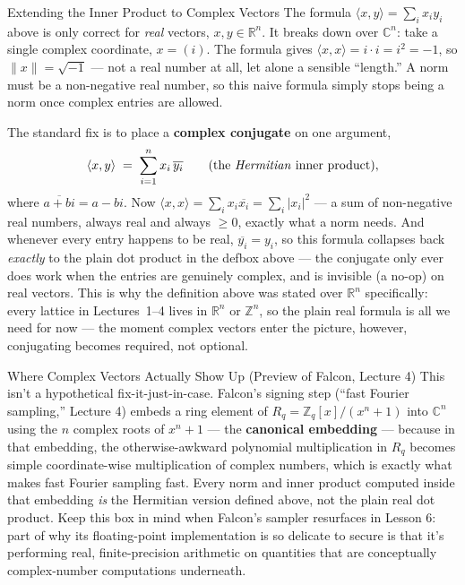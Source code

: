 \begin{rmkbox}{Extending the Inner Product to Complex Vectors}
The formula $\langle x,y\rangle=\sum_i x_iy_i$ above is only correct for \emph{real} vectors, $x,y\in\mathbb{R}^n$. It breaks down over $\mathbb{C}^n$: take a single complex coordinate, $x=(i)$. The formula gives $\langle x,x\rangle = i\cdot i = i^2 = -1$, so $\|x\| = \sqrt{-1}$ --- not a real number at all, let alone a sensible ``length.'' A norm must be a non-negative real number, so this naive formula simply stops being a norm once complex entries are allowed.

The standard fix is to place a \textbf{complex conjugate} on one argument,
$$
\langle x,y\rangle \;=\; \sum_{i=1}^n x_i\,\overline{y_i} \qquad \text{(the \emph{Hermitian} inner product)},
$$
where $\overline{a+bi} = a-bi$. Now $\langle x,x\rangle = \sum_i x_i\overline{x_i} = \sum_i |x_i|^2$ --- a sum of non-negative real numbers, always real and always $\ge 0$, exactly what a norm needs. And whenever every entry happens to be real, $\overline{y_i}=y_i$, so this formula collapses back \emph{exactly} to the plain dot product in the defbox above --- the conjugate only ever does work when the entries are genuinely complex, and is invisible (a no-op) on real vectors. This is why the definition above was stated over $\mathbb{R}^n$ specifically: every lattice in Lectures~1--4 lives in $\mathbb{R}^n$ or $\mathbb{Z}^n$, so the plain real formula is all we need for now --- the moment complex vectors enter the picture, however, conjugating becomes required, not optional.
\end{rmkbox}

\begin{previewbox}{Where Complex Vectors Actually Show Up (Preview of Falcon, Lecture 4)}
This isn't a hypothetical fix-it-just-in-case. Falcon's signing step (``fast Fourier sampling,'' Lecture 4) embeds a ring element of $R_q = \mathbb{Z}_q[x]/(x^n+1)$ into $\mathbb{C}^n$ using the $n$ complex roots of $x^n+1$ --- the \textbf{canonical embedding} --- because in that embedding, the otherwise-awkward polynomial multiplication in $R_q$ becomes simple coordinate-wise multiplication of complex numbers, which is exactly what makes fast Fourier sampling fast. Every norm and inner product computed inside that embedding \emph{is} the Hermitian version defined above, not the plain real dot product. Keep this box in mind when Falcon's sampler resurfaces in Lesson 6: part of why its floating-point implementation is so delicate to secure is that it's performing real, finite-precision arithmetic on quantities that are conceptually complex-number computations underneath.
\end{previewbox}

